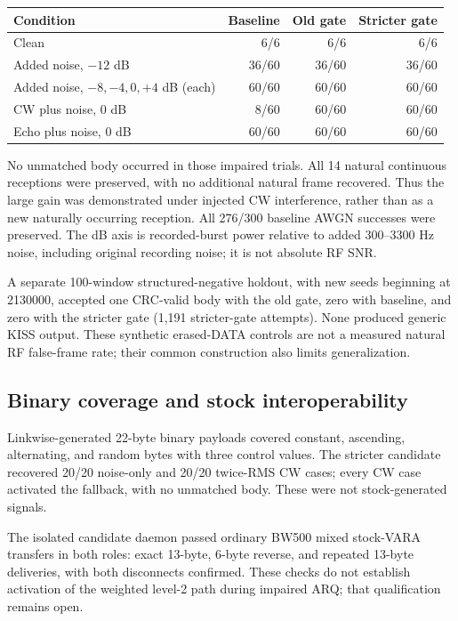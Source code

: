 \documentclass[11pt,a4paper]{article}
\begin{document}
\begin{center}
\begin{tabular}{lrrr}
\toprule
Condition & Baseline & Old gate & Stricter gate \\
\midrule
Clean & 6/6 & 6/6 & 6/6 \\
Added noise, $-12$ dB & 36/60 & 36/60 & 36/60 \\
Added noise, $-8,-4,0,+4$ dB (each) & 60/60 & 60/60 & 60/60 \\
CW plus noise, 0 dB & 8/60 & 60/60 & 60/60 \\
Echo plus noise, 0 dB & 60/60 & 60/60 & 60/60 \\
\bottomrule
\end{tabular}
\end{center}
No unmatched body occurred in those impaired trials. All 14 natural continuous
receptions were preserved, with no additional natural frame recovered. Thus the
large gain was demonstrated under injected CW interference, rather than as a
new naturally occurring reception. All 276/300 baseline AWGN successes were
preserved. The dB axis is recorded-burst power relative to added 300--3300 Hz
noise, including original recording noise; it is not absolute RF SNR.

A separate 100-window structured-negative holdout, with new seeds beginning at
2130000, accepted one CRC-valid body with the old gate, zero with baseline, and
zero with the stricter gate (1,191 stricter-gate attempts). None produced generic
KISS output. These synthetic erased-DATA controls are not a measured natural RF
false-frame rate; their common construction also limits generalization.

\subsection{Binary coverage and stock interoperability}
Linkwise-generated 22-byte binary payloads covered constant, ascending,
alternating, and random bytes with three control values. The stricter candidate
recovered 20/20 noise-only and 20/20 twice-RMS CW cases; every CW case activated
the fallback, with no unmatched body. These were not stock-generated signals.

The isolated candidate daemon passed ordinary BW500 mixed stock-VARA transfers
in both roles: exact 13-byte, 6-byte reverse, and repeated 13-byte deliveries,
with both disconnects confirmed. These checks do not establish activation of the
weighted level-2 path during impaired ARQ; that qualification remains open.
\end{document}
